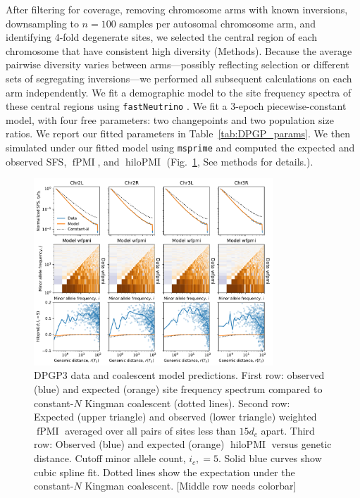 \documentclass[11pt, letterpaper]{article}   	%
\newcommand{\fig}[1]{Fig.~\ref{#1}}
\DeclareMathOperator{\fpmi}{fPMI}
\DeclareMathOperator{\hilopmi}{hiloPMI}
\begin{document}
After filtering for coverage, removing chromosome arms with known inversions, downsampling to $n=100$ samples per autosomal chromosome arm, and identifying 4-fold degenerate sites, we selected the central region of each chromosome that have consistent high diversity (Methods).
Because the average pairwise diversity varies between arms---possibly reflecting selection or different sets of segregating inversions---we performed all subsequent calculations on each arm independently.
We fit a demographic model to the site frequency spectra of these central regions using \texttt{fastNeutrino} \cite{BhaskarEtAl2015}.
We fit a 3-epoch piecewise-constant model, with four free parameters: two changepoints and two population size ratios.
We report our fitted parameters in Table~\ref{tab:DPGP_params}.
We then simulated under our fitted model using \texttt{msprime} and computed the expected and observed SFS, $\fpmi$, and $\hilopmi$ (\fig{fig:dpgp3}, See methods for details.).

\begin{figure}
\centering
\includegraphics[width=0.8\textwidth]{figures/figure6.pdf}
\caption{DPGP3 data and coalescent model predictions. First row: observed (blue) and expected (orange) site frequency spectrum compared to constant-$N$ Kingman coalescent (dotted lines). Second row: Expected (upper triangle) and observed (lower triangle) weighted $\fpmi$ averaged over all pairs of sites less than $15 d_c$ apart. Third row: Observed (blue) and expected (orange) $\hilopmi$ versus genetic distance. Cutoff minor allele count, $i_c, = 5$. Solid blue curves show cubic spline fit. Dotted lines show the expectation under the constant-$N$ Kingman coalescent. [Middle row needs colorbar] \label{fig:dpgp3}}
\end{figure}
\end{document}
